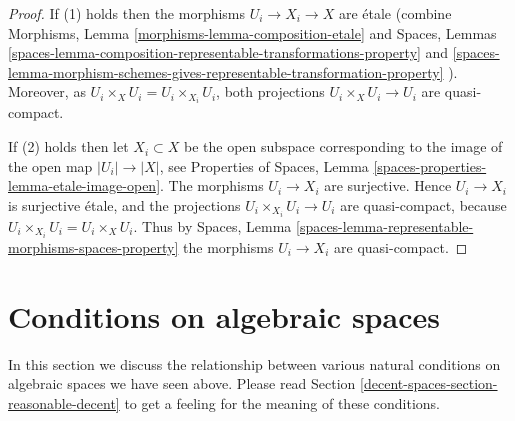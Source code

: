 \begin{proof}
If (1) holds then the morphisms $U_i \to X_i \to X$ are \'etale (combine
Morphisms, Lemma \ref{morphisms-lemma-composition-etale}
and
Spaces, Lemmas
\ref{spaces-lemma-composition-representable-transformations-property} and
\ref{spaces-lemma-morphism-schemes-gives-representable-transformation-property}
).
Moreover, as $U_i \times_X U_i = U_i \times_{X_i} U_i$,
both projections $U_i \times_X U_i \to U_i$ are quasi-compact.

\medskip\noindent
If (2) holds then let $X_i \subset X$ be the open subspace corresponding
to the image of the open map $|U_i| \to |X|$, see
Properties of Spaces,
Lemma \ref{spaces-properties-lemma-etale-image-open}.
The morphisms $U_i \to X_i$ are surjective.
Hence $U_i \to X_i$ is surjective \'etale, and the projections
$U_i \times_{X_i} U_i \to U_i$ are quasi-compact, because
$U_i \times_{X_i} U_i = U_i \times_X U_i$. Thus by
Spaces, Lemma \ref{spaces-lemma-representable-morphisms-spaces-property}
the morphisms $U_i \to X_i$ are quasi-compact.
\end{proof}

\section{Conditions on algebraic spaces}
\label{decent-spaces-section-conditions}
In this section we discuss the relationship between various natural
conditions on algebraic spaces we have seen above. Please read
Section \ref{decent-spaces-section-reasonable-decent}
to get a feeling for the meaning of these conditions.

